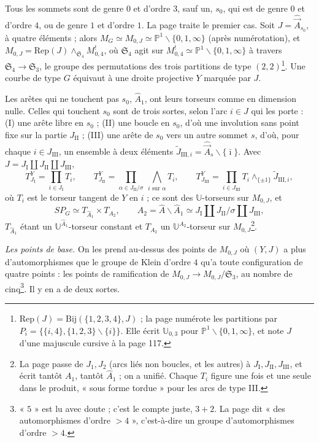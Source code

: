 \documentclass[11pt,a4paper]{article}
\begin{document}
Tous les sommets sont de genre $0$ et d'ordre $3$, sauf un, $s_0$, qui est de
genre $0$ et d'ordre $4$, ou de genre $1$ et d'ordre $1$. La page traite le
premier cas. Soit $J = \hat{\vec A}_{s_0}$, à quatre éléments ; alors $M_G
\simeq M_{0,J} \simeq \mathbb{P}^1 \smallsetminus \{0, 1, \infty\}$ (après
numérotation), et $M_{0,J} = \mathrm{Rep}(J) \wedge_{\mathfrak{S}_4}
M^{!}_{0,4}$, où $\mathfrak{S}_4$ agit sur $M^{!}_{0,4} \simeq
\mathbb{P}^1 \smallsetminus \{0,1,\infty\}$ à travers $\mathfrak{S}_4 \to
\mathfrak{S}_3$, le groupe des permutations des trois partitions de type
$(2,2)$\footnote{$\mathrm{Rep}(J) = \mathrm{Bij}(\{1,2,3,4\}, J)$ ; la page
numérote les partitions par $P_i = \{\{i,4\}, \{1,2,3\} \smallsetminus
\{i\}\}$. Elle écrit $\mathbb{U}_{0,3}$ pour $\mathbb{P}^1 \smallsetminus
\{0,1,\infty\}$, et note $J$ d'une majuscule cursive à la page 117.}. Une
courbe de type $G$ équivaut à une droite projective $Y$ marquée par $J$.

Les arêtes qui ne touchent pas $s_0$, $\hat A_1$, ont leurs torseurs comme en
dimension nulle. Celles qui touchent $s_0$ sont de trois sortes, selon l'arc
$i \in J$ qui les porte : (I) une arête libre en $s_0$ ; (II) une boucle en
$s_0$, d'où une involution sans point fixe sur la partie $J_{\mathrm{II}}$ ;
(III) une arête de $s_0$ vers un autre sommet $s$, d'où, pour chaque $i \in
J_{\mathrm{III}}$, un ensemble à deux éléments $\tilde J_{\mathrm{III},i} = \hat{\vec
A}_s \smallsetminus \{\bar\imath\}$. Avec $J = J_{\mathrm{I}} \amalg
J_{\mathrm{II}} \amalg J_{\mathrm{III}}$,
\[
T^Y_{J_{\mathrm{I}}} = \prod_{i \in J_{\mathrm{I}}} T_i, \qquad
T^Y_{J_{\mathrm{II}}} = \prod_{\alpha \in J_{\mathrm{II}}/\sigma}
\ \bigwedge_{i \text{ sur } \alpha} T_i, \qquad
T^Y_{J_{\mathrm{III}}} = \prod_{i \in J_{\mathrm{III}}} T_i \wedge_{\{\pm1\}}
\tilde J_{\mathrm{III},i},
\]
où $T_i$ est le torseur tangent de $Y$ en $i$ ; ce sont des
$\mathbb{U}$-torseurs sur $M_{0,J}$, et
\[
SP_G \simeq T_{\hat A_1} \times T_{A_2}, \qquad A_2 = \hat A \smallsetminus
\hat A_1 \simeq J_{\mathrm{I}} \amalg J_{\mathrm{II}}/\sigma \amalg
J_{\mathrm{III}},
\]
$T_{\hat A_1}$ étant un $\mathbb{U}^{\hat A_1}$-torseur constant et
$T_{A_2}$ un $\mathbb{U}^{A_2}$-torseur sur $M_{0,J}$\footnote{La page passe de
$J_1, J_2$ (arcs liés non boucles, et les autres) à $J_{\mathrm{I}},
J_{\mathrm{II}}, J_{\mathrm{III}}$, et écrit tantôt $A_1$, tantôt $\hat A_1$ ; on
a unifié. Chaque $T_i$ figure une fois et une seule dans le produit, « sous
forme tordue » pour les arcs de type III.}.

\emph{Les points de base.} On les prend au-dessus des points de $M_{0,J}$ où
$(Y, J)$ a plus d'automorphismes que le groupe de Klein d'ordre $4$ qu'a toute
configuration de quatre points : les points de ramification de $M_{0,J} \to
M_{0,J}/\mathfrak{S}_3$, au nombre de cinq\footnote{« $5$ » est lu avec doute ;
c'est le compte juste, $3 + 2$. La page dit « des automorphismes d'ordre $> 4$
», c'est-à-dire un groupe d'automorphismes d'ordre $> 4$.}. Il y en a de deux
sortes.
\end{document}

